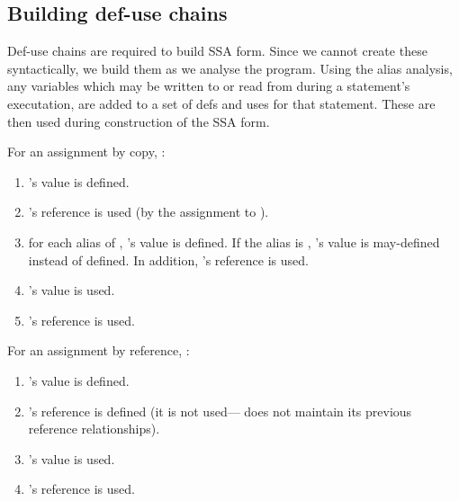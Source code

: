 {\subsection{Building def-use chains}

Def-use chains are required to build SSA form.
Since we cannot create these syntactically, we build them as we analyse the program.
Using the alias analysis, any variables which may be written to or read from during a statement's executation, are added to a set of defs and uses for that statement.
These are then used during construction of the SSA form.

For an assignment by copy, :

\begin{enumerate}

	\item
		's value is defined.

	\item
		's reference is used (by the assignment to ).

	\item
		for each alias  of , 's value is defined.
		If the alias is , 's value is may-defined instead of defined.
		In addition, 's reference is used.

	\item
		's value is used.

	\item
		's reference is used.

\end{enumerate}

For an assignment by reference, :

\begin{enumerate}

	\item
		's value is defined.

	\item
		's reference is defined (it is not used--- does not maintain its previous reference relationships).

	\item
		's value is used.

	\item
		's reference is used.

\end{enumerate}



}
